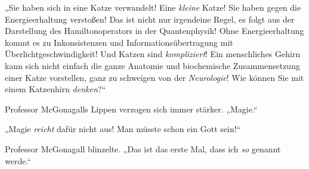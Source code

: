 „Sie haben sich in eine Katze verwandelt! Eine \emph{kleine} Katze! Sie haben gegen die Energieerhaltung verstoßen! Das ist nicht nur irgendeine Regel, es folgt aus der Darstellung des Hamiltonoperators in der Quantenphysik! Ohne Energieerhaltung kommt es zu Inkonsistenzen und Informationsübertragung mit Überlichtgeschwindigkeit! Und Katzen sind \emph{kompliziert}! Ein menschliches Gehirn kann sich nicht einfach die ganze Anatomie und biochemische Zusammensetzung einer Katze vorstellen, ganz zu schweigen von der \emph{Neurologie}! Wie können Sie mit einem Katzenhirn \emph{denken}?“

Professor McGonagalls Lippen verzogen sich immer stärker. „Magie.“

„Magie \emph{reicht} dafür nicht aus! Man müsste schon ein Gott sein!“

Professor McGonagall blinzelte. „Das ist das erste Mal, dass ich \emph{so} genannt werde.“

